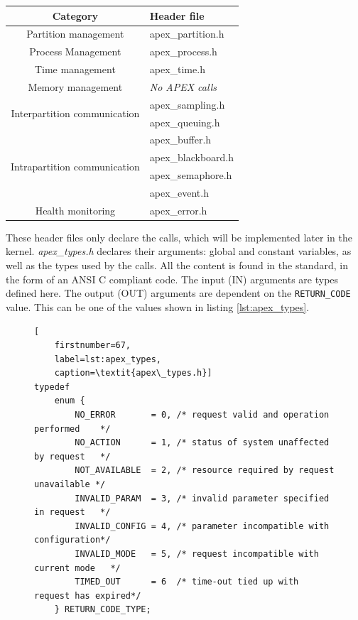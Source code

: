 \begin{table}[H]

	\centering
	\begin{tabular}{|c|p{3.1cm}|}
		\hline
		Category			&	Header file	\\
		\hline
		Partition management 	&	apex\_partition.h	\\
		\hline
		Process Management	&	apex\_process.h\\
		\hline
		Time management	&	apex\_time.h\\
		\hline
		Memory management	&	\textit{No APEX calls}\\
		\hline
	\multirow{2}{*}{Interpartition communication}	&	apex\_sampling.h\\
											& 	apex\_queuing.h\\
		\hline
	\multirow{4}{*}{Intrapartition communication}	&	apex\_buffer.h		\\
											& 	apex\_blackboard.h	\\
											& 	apex\_semaphore.h \\
											& 	apex\_event.h	\\
		\hline
		Health monitoring	& 	apex\_error.h\\
		\hline
	\end{tabular}
	\label{tab:apex_calls}
\end{table}

These header files only declare the calls, which will be implemented later
in the kernel. \textit{apex\_types.h} declares their arguments:
global and
constant variables, as well as the types used by the calls. All the content is found
in the standard, in the form of an ANSI C compliant code.
The input (IN) arguments are types defined here. The output (OUT)
arguments are dependent on the \texttt{RETURN\_CODE} value.
This can be one of the values shown in listing \ref{lst:apex_types}.

\begin{figure}[H]
\lstset{
	language=C,
	basicstyle=\footnotesize,
	showspaces=false,
	showtabs=false,
	showstringspaces=false,
	tabsize=4,
	breaklines=true
}
\begin{lstlisting}[
	firstnumber=67,
	label=lst:apex_types,
	caption=\textit{apex\_types.h}]
typedef
    enum {
        NO_ERROR       = 0, /* request valid and operation performed    */
        NO_ACTION      = 1, /* status of system unaffected by request   */
        NOT_AVAILABLE  = 2, /* resource required by request unavailable */
        INVALID_PARAM  = 3, /* invalid parameter specified in request   */
        INVALID_CONFIG = 4, /* parameter incompatible with configuration*/
        INVALID_MODE   = 5, /* request incompatible with current mode   */
        TIMED_OUT      = 6  /* time-out tied up with request has expired*/
    } RETURN_CODE_TYPE;
\end{lstlisting}
\end{figure}


